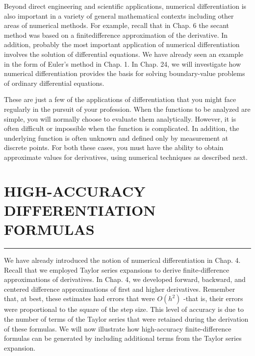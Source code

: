 \documentclass[../main.tex]{subfiles}
\begin{document}
Beyond direct engineering and scientific applications, numerical differentiation is also
important in a variety of general mathematical contexts including other areas of numerical
methods. For example, recall that in Chap. 6 the secant method was based on a finitedifference approximation of the derivative. In addition, probably the most important application of numerical differentiation involves the solution of differential equations. We have
already seen an example in the form of Euler's method in Chap. 1. In Chap. 24, we will investigate how numerical differentiation provides the basis for solving boundary-value
problems of ordinary differential equations.

These are just a few of the applications of differentiation that you might face regularly
in the pursuit of your profession. When the functions to be analyzed are simple, you will normally choose to evaluate them analytically. However, it is often difficult or impossible when
the function is complicated. In addition, the underlying function is often unknown and defined only by measurement at discrete points. For both these cases, you must have the ability
to obtain approximate values for derivatives, using numerical techniques as described next.

\vspace{0,6in}
\section{HIGH-ACCURACY DIFFERENTIATION FORMULAS}
\vspace{0,1in}
\hrule
\vspace{0,1in}
We have already introduced the notion of numerical differentiation in Chap. 4. Recall that
we employed Taylor series expansions to derive finite-difference approximations of derivatives. In Chap. 4, we developed forward, backward, and centered difference approximations
of first and higher derivatives. Remember that, at best, these estimates had errors that were $O(h^{2})$ -that is, their errors were proportional to the square of the step size. This level of
accuracy is due to the number of terms of the Taylor series that were retained during the derivation of these formulas. We will now illustrate how high-accuracy finite-difference formulas can be generated by including additional terms from the Taylor series expansion.
\end{document}
